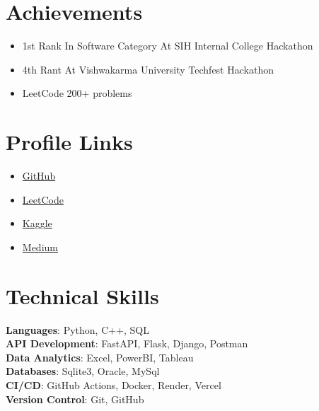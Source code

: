 \documentclass[letterpaper,11pt]{article}
\newcommand{\resumeItem}[1]{
  \item\small{
	{#1 \vspace{-2pt}}
  }
}
\newcommand{\resumeItemListStart}{\begin{itemize}}
\newcommand{\resumeItemListEnd}{\end{itemize}\vspace{-5pt}}
\begin{document}
%
\section{Achievements}
 \begin{itemize}[leftmargin=0.15in, label={}]
	\resumeItemListStart
    	\resumeItem{1st Rank In Software Category At SIH Internal College Hackathon}
    	\resumeItem{4th Rant At Vishwakarma University Techfest Hackathon}
    	\resumeItem{LeetCode 200+ problems}
  	\resumeItemListEnd
 \end{itemize}
 \vspace{-16pt}
 
\section{Profile Links}
 \begin{itemize}[leftmargin=0.15in, label={}]
	\resumeItemListStart
    	\resumeItem {\href{https://github.com/Myash21}{GitHub}}
    	\resumeItem {\href{https://leetcode.com/u/YashMhaskar/}{LeetCode}}
    	\resumeItem {\href{https://www.kaggle.com/myash21}{Kaggle}}
        \resumeItem {\href{https://medium.com/@yashmhaskar21}{Medium}}
  	\resumeItemListEnd
 \end{itemize}
 \vspace{-16pt}

%
\section{Technical Skills}
 \begin{itemize}[leftmargin=0.15in, label={}]
	\small{\item{
	\textbf{Languages}{: Python, C++, SQL} \\
	\textbf{API Development}{: FastAPI, Flask, Django, Postman} \\
	\textbf{Data Analytics}{: Excel, PowerBI, Tableau} \\
	\textbf{Databases}{: Sqlite3, Oracle, MySql} \\
	\textbf{CI/CD}{: GitHub Actions, Docker, Render, Vercel} \\
	\textbf{Version Control}{: Git, GitHub} \\
	}}
 \end{itemize}
 \vspace{-16pt}
\end{document}

